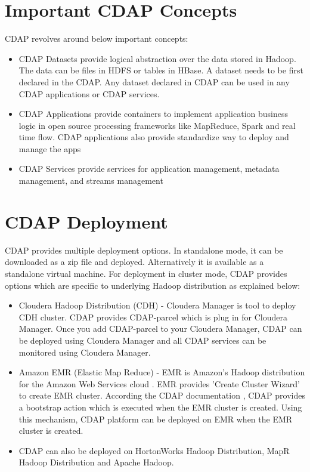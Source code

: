 \documentclass[9pt,twocolumn,twoside]{../../styles/osajnl}
\begin{document}
\section{Important CDAP Concepts}
CDAP revolves around below important concepts:
\begin{itemize}
\item CDAP Datasets provide logical abstraction over the data stored in
Hadoop. The data can be files in HDFS or tables in HBase. A dataset needs to
be first declared in the CDAP. Any dataset declared in CDAP can be used in
any CDAP applications or CDAP services.
\item CDAP Applications provide containers to implement application business
logic in open source processing frameworks like MapReduce, Spark and real
time flow. CDAP applications also provide standardize way to deploy and
manage the apps
\item CDAP Services provide services for application management, metadata
management, and streams management
\end{itemize}

\section{CDAP Deployment}
CDAP provides multiple deployment options. In standalone mode, it can be
downloaded as a zip file and deployed.
Alternatively it is available as a standalone virtual machine.
For deployment in cluster mode, CDAP provides options which are specific to
underlying Hadoop distribution as explained below:
\begin{itemize}
\item Cloudera Hadoop Distribution (CDH) - Cloudera Manager
\cite{www-cdh-manager} is tool to deploy CDH cluster. CDAP provides
CDAP-parcel \cite{www-cdap-cloudera-manager} which is plug in for
Cloudera Manager. Once you add CDAP-parcel to your Cloudera Manager, CDAP can
 be deployed using Cloudera Manager and all CDAP services can be monitored
 using Cloudera Manager.
\item Amazon EMR (Elastic Map Reduce) - EMR is Amazon's Hadoop distribution
for the Amazon Web Services cloud \cite{www-amazon-emr}.  EMR provides
'Create Cluster Wizard' to create EMR cluster. According the CDAP
documentation \cite{www-cdap-emr}, CDAP provides a bootstrap action which is
executed when the EMR cluster is created. Using this mechanism, CDAP platform
 can be deployed on EMR when the EMR cluster is created.
\item
CDAP can also be deployed on HortonWorks Hadoop Distribution, MapR Hadoop
Distribution and Apache Hadoop.
\end{itemize}
\end{document}
